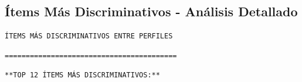 \documentclass[
  11pt,
  letterpaper,
  DIV=11,
  numbers=noendperiod]{scrartcl}
\begin{document}
\subsection{Ítems Más Discriminativos - Análisis
Detallado}\label{uxedtems-muxe1s-discriminativos---anuxe1lisis-detallado}

\begin{verbatim}
ÍTEMS MÁS DISCRIMINATIVOS ENTRE PERFILES
\end{verbatim}

\begin{verbatim}
=========================================
\end{verbatim}

\begin{verbatim}
**TOP 12 ÍTEMS MÁS DISCRIMINATIVOS:**
\end{verbatim}
\end{document}

